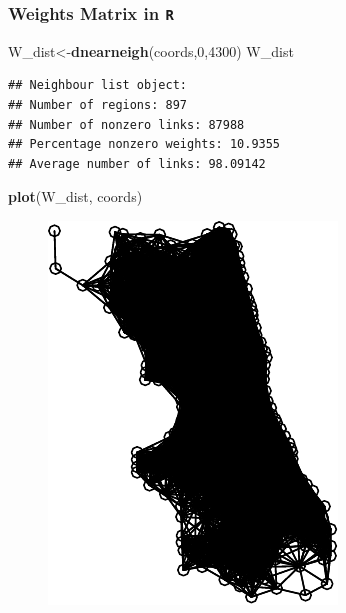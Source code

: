 \documentclass[
  shownotes,
  xcolor={svgnames},
  hyperref={colorlinks,citecolor=DarkBlue,linkcolor=DarkRed,urlcolor=DarkBlue}
  ]{beamer}
\newenvironment{Shaded}{\begin{snugshade}}{\end{snugshade}}
\newcommand{\DecValTok}[1]{\textcolor[rgb]{0.00,0.00,0.81}{#1}}
\newcommand{\KeywordTok}[1]{\textcolor[rgb]{0.13,0.29,0.53}{\textbf{#1}}}
\newcommand{\NormalTok}[1]{#1}
\begin{document}
\begin{frame}[fragile]
\frametitle{Weights Matrix in \texttt{R}}

\begin{scriptsize}
\begin{Shaded}
\begin{Highlighting}[]
\NormalTok{W\_dist\textless{}{-}}\KeywordTok{dnearneigh}\NormalTok{(coords,}\DecValTok{0}\NormalTok{,}\DecValTok{4300}\NormalTok{)}
\NormalTok{W\_dist}
\end{Highlighting}
\end{Shaded}
\end{scriptsize}

\begin{tiny}
\begin{verbatim}
## Neighbour list object:
## Number of regions: 897 
## Number of nonzero links: 87988 
## Percentage nonzero weights: 10.9355 
## Average number of links: 98.09142
\end{verbatim}
\end{tiny}

\begin{scriptsize}
\begin{Shaded}
\begin{Highlighting}[]
\KeywordTok{plot}\NormalTok{(W\_dist, coords)}
\end{Highlighting}
\end{Shaded}
\end{scriptsize}


 \begin{figure}[H] \centering
    \captionsetup{justification=centering}
    \includegraphics[scale=0.7]{Example_12_files/figure-latex/unnamed-chunk-4-1.pdf}
   \end{figure}



\end{frame}
\end{document}
